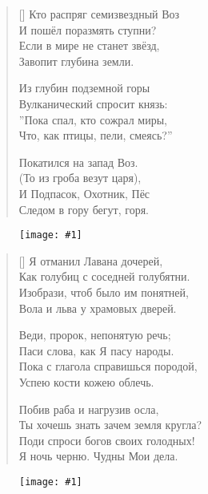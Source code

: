 \documentclass[12pt,a5paper,twoside]{article}
\newcommand{\pict}[1]{\thispagestyle{empty}\begin{figure}[H]\begin{center}\texttt{[image: \#1]}\end{center}\end{figure}\newpage}
\begin{document}
		
\settowidth{\versewidth}{Кто распряг семизвездный Воз}
\begin{verse}[\versewidth]
Кто распряг семизвездный Воз\\
И пошёл поразмять ступни?\\
Если в мире не станет звёзд,\\
Завопит глубина земли.

Из глубин подземной горы\\
Вулканический спросит князь:\\
”Пока  спал, кто сожрал миры,\\
Что, как птицы, пели, смеясь?”

Покатился на запад Воз.\\
(То из гроба везут царя),\\
И Подпасок, Охотник, Пёс\\
Следом в гору бегут, горя.
\end{verse}
\newpage


\pict{picts/Ya_otmanil.png} 


\settowidth{\versewidth}{Я отманил Лавана дочерей,}
\begin{verse}[\versewidth]		
Я отманил Лавана дочерей,\\
Как голубиц с соседней голубятни.\\
Изобрази, чтоб было им понятней,\\
Вола и льва у храмовых дверей.

Веди, пророк, непонятую речь;\\
Паси слова, как Я пасу народы.\\
Пока с глагола справишься породой,\\
Успею кости кожею облечь.

Побив раба и нагрузив осла,\\
Ты хочешь знать зачем земля кругла?\\
Поди спроси богов своих голодных!\\
Я ночь черню. Чудны Мои дела.
\end{verse}
\newpage

\pict{picts/Na_svadbu_piva1.png} 
\end{document}
